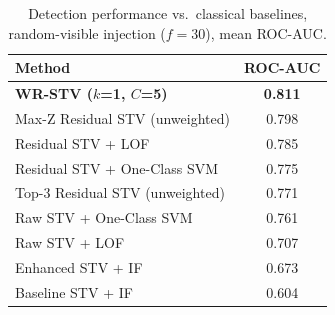 \begin{table}[t]
\centering
\caption{Detection performance vs.\ classical baselines, random-visible
injection ($f=30$), mean ROC-AUC.}
\label{tab:extra-baselines}
\begin{tabular}{lc}
\toprule
\textbf{Method} & \textbf{ROC-AUC} \\
\midrule
\textbf{WR-STV ($k$=1, $C$=5)}   & \textbf{0.811} \\
Max-Z Residual STV (unweighted) & 0.798 \\
Residual STV + LOF              & 0.785 \\
Residual STV + One-Class SVM    & 0.775 \\
Top-3 Residual STV (unweighted) & 0.771 \\
Raw STV + One-Class SVM         & 0.761 \\
Raw STV + LOF                   & 0.707 \\
Enhanced STV + IF               & 0.673 \\
Baseline STV + IF               & 0.604 \\
\bottomrule
\end{tabular}
\end{table}
